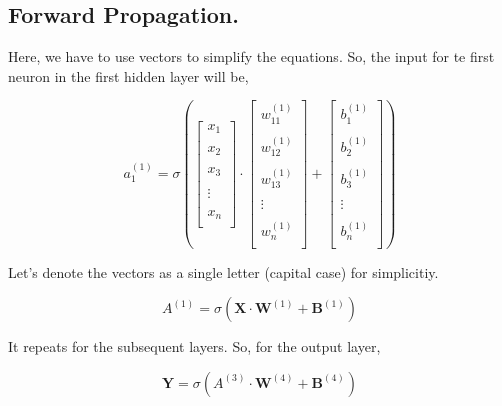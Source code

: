 \documentclass[12pt]{article}
\begin{document}
\subsection*{Forward Propagation.}

Here, we have to use vectors to simplify the equations. So, the input for te first neuron in the first hidden layer will be, 

\[
  a_1 ^{(1)} = \sigma (\begin{bmatrix}
     x_1 \\
     \\
     x_2 \\
     \\
     x_3 \\
     \\
     \vdots \\
     \\
     x_n \\
  \end{bmatrix} \cdot \begin{bmatrix}
     w_{11}^{(1)} \\
     \\
     w_{12}^{(1)} \\
     \\
     w_{13}^{(1)} \\
     \\
     \vdots \\
     \\
     w_{n}^{(1)} \\
  \end{bmatrix} + \begin{bmatrix}
     b_1^{(1)} \\
     \\
     b_2^{(1)} \\
     \\
     b_3^{(1)} \\
     \\
     \vdots \\
     \\
     b_n^{(1)} \\
  \end{bmatrix} )
\]

Let's denote the vectors as a single letter (capital case) for simplicitiy. 

\[
  A^{(1)}= \sigma (\mathbf{X} \cdot \mathbf{W}^{(1)} + \mathbf{B}^{(1)})
\]

It repeats for the subsequent layers. So, for the output layer, 

\[
  \mathbf{Y} = \sigma (A^{(3)} \cdot \mathbf{W}^{(4)} + \mathbf{B}^{(4)})
\]
\end{document}
